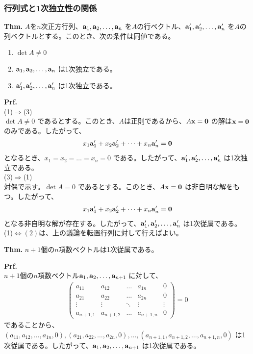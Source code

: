 \documentclass[a4paper,11pt]{jsarticle}
\numberwithin{equation}{section}
\begin{document}
\subsubsection{行列式と1次独立性の関係}
\begin{itembox}[l]{\textbf{Thm.}}
  $A$を$n$次正方行列、$\vb{a}_1, \vb{a}_2, \dots, \vb{a}_n$ を$A$の行ベクトル、$\vb{a}_1', \vb{a}_2', \dots, \vb{a}_n'$ を$A$の列ベクトルとする。このとき、次の条件は同値である。
  \begin{enumerate}
    \item $\det A \neq 0$
    \item $\vb{a}_1, \vb{a}_2, \dots, \vb{a}_n$ は1次独立である。
    \item $\vb{a}_1', \vb{a}_2', \dots, \vb{a}_n'$ は1次独立である。
  \end{enumerate} 
\end{itembox}
\textbf{Prf.}\\
(1)$\Rightarrow$(3)\\
$\det A \neq 0$ であるとする。このとき、$A$は正則であるから、$A\vb{x} = \vb{0}$ の解は$\vb{x} = \vb{0}$ のみである。したがって、
\begin{align}
  x_1\vb{a}_1' + x_2\vb{a}_2' + \dots + x_n\vb{a}_n' = \vb{0}
\end{align}
となるとき、$x_1 = x_2 = \dots = x_n = 0$ である。したがって、$\vb{a}_1', \vb{a}_2', \dots, \vb{a}_n'$ は1次独立である。\\
(3)$\Rightarrow$(1)\\
対偶で示す。$\det A = 0$ であるとする。このとき、$A\vb{x} = \vb{0}$ は非自明な解をもつ。したがって、
\begin{align}
  x_1\vb{a}_1' + x_2\vb{a}_2' + \dots + x_n\vb{a}_n' = \vb{0}
\end{align}
となる非自明な解が存在する。したがって、$\vb{a}_1', \vb{a}_2', \dots, \vb{a}_n'$ は1次従属である。\\
(1)$\Leftrightarrow(2)$は、上の議論を転置行列に対して行えばよい。\hfill\qedsymbol\\

\begin{itembox}[l]{\textbf{Thm.}}
  $n+1$個の$n$項数ベクトルは1次従属である。
\end{itembox}
\textbf{Prf.}\\
$n+1$個の$n$項数ベクトル$\vb{a}_1, \vb{a}_2, \dots, \vb{a}_{n+1}$ に対して、
\begin{align}
  \begin{pmatrix}
    a_{11} & a_{12} & \dots & a_{1n} & 0\\
    a_{21} & a_{22} & \dots & a_{2n} & 0\\
    \vdots & \vdots & \ddots & \vdots & \vdots\\
    a_{n+1,1} & a_{n+1,2} & \dots & a_{n+1,n} & 0
  \end{pmatrix}
  = 0
\end{align}
であることから、$(a_{11}, a_{12}, \dots, a_{1n}, 0), (a_{21}, a_{22}, \dots, a_{2n}, 0), \dots, (a_{n+1,1}, a_{n+1,2}, \dots, a_{n+1,n}, 0)$ は1次従属である。したがって、$\vb{a}_1, \vb{a}_2, \dots, \vb{a}_{n+1}$ は1次従属である。\hfill\qedsymbol\\
\end{document}
